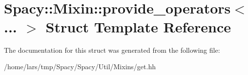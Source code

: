 \hypertarget{structSpacy_1_1Mixin_1_1provide__operators}{}\section{Spacy\+:\+:Mixin\+:\+:provide\+\_\+operators$<$... $>$ Struct Template Reference}
\label{structSpacy_1_1Mixin_1_1provide__operators}


The documentation for this struct was generated from the following file\+:\begin{DoxyCompactItemize}
\item 
/home/lars/tmp/\+Spacy/\+Spacy/\+Util/\+Mixins/get.\+hh\end{DoxyCompactItemize}
